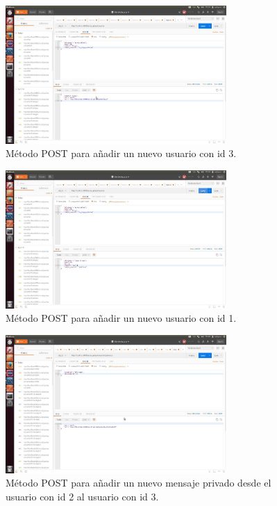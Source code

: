 \documentclass[12pt,a4paper, spanish]{article}
\begin{document}
\begin{figure}[H]
	\centering
	\includegraphics[width=0.75\textwidth]{images/captura9.jpg}
	\caption{Método POST para añadir un nuevo usuario con id 3.}
\end{figure}

\begin{figure}[H]
	\centering
	\includegraphics[width=0.75\textwidth]{images/captura10.jpg}
	\caption{Método POST para añadir un nuevo usuario con id 1.}
\end{figure}

\begin{figure}[H]
	\centering
	\includegraphics[width=0.75\textwidth]{images/captura11.jpg}
	\caption{Método POST para añadir un nuevo mensaje privado desde el usuario con id 2 al usuario con id 3.}
\end{figure}
\end{document}
